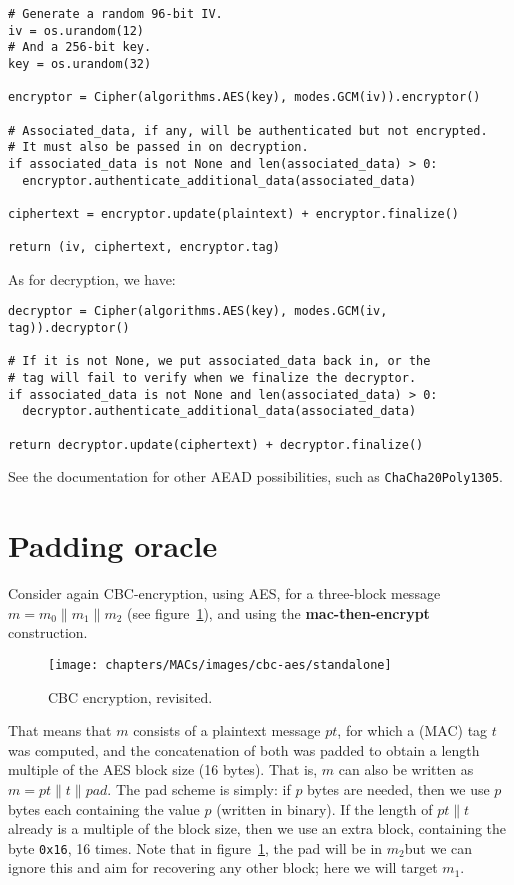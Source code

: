   \begin{verbatim}
# Generate a random 96-bit IV.
iv = os.urandom(12)
# And a 256-bit key.
key = os.urandom(32)

encryptor = Cipher(algorithms.AES(key), modes.GCM(iv)).encryptor()

# Associated_data, if any, will be authenticated but not encrypted.
# It must also be passed in on decryption.
if associated_data is not None and len(associated_data) > 0:
  encryptor.authenticate_additional_data(associated_data)

ciphertext = encryptor.update(plaintext) + encryptor.finalize()

return (iv, ciphertext, encryptor.tag)
  \end{verbatim}

  As for decryption, we have:
  \begin{verbatim}
decryptor = Cipher(algorithms.AES(key), modes.GCM(iv, tag)).decryptor()

# If it is not None, we put associated_data back in, or the
# tag will fail to verify when we finalize the decryptor.
if associated_data is not None and len(associated_data) > 0:
  decryptor.authenticate_additional_data(associated_data)

return decryptor.update(ciphertext) + decryptor.finalize()
  \end{verbatim}
  See the documentation for other AEAD possibilities, such as \texttt{ChaCha20Poly1305}.

\section{Padding oracle}
  \label{sec:padding_oracle}
  Consider again CBC-encryption, using AES, for a three-block message $m = m_0\|m_1\|m_2$ (see figure~\ref{fig:cbc_padding_oracle}), and using the \textbf{mac-then-encrypt} construction.
  \begin{figure}[hb!]
    \centering
    \texttt{[image: chapters/MACs/images/cbc-aes/standalone]}
    \caption{CBC encryption, revisited.}
    \label{fig:cbc_padding_oracle}
  \end{figure}
  That means that $m$ consists of a plaintext message $pt$, for which a (MAC) tag $t$ was computed, and the concatenation of both was padded to obtain a length multiple of the AES block size (16 bytes). That is, $m$ can also be written as $m = pt\|t\|pad$. The pad scheme is simply: if $p$ bytes are needed, then we use $p$ bytes each containing the value $p$ (written in binary). If the length of $pt\|t$ already is a multiple of the block size, then we use an extra block, containing the byte \texttt{0x16}, 16 times. Note that in figure~\ref{fig:cbc_padding_oracle}, the pad will be in $m_2$\emd but we can ignore this and aim for recovering any other block; here we will target $m_1$.

